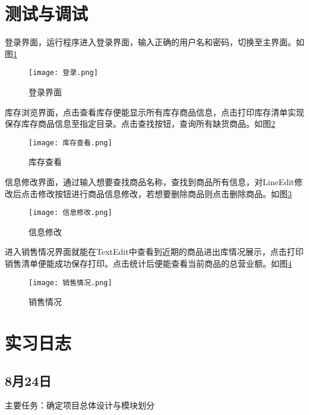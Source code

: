 \documentclass[
   projtype=report, %
   output=print,     %
  ]{nwafuprojrep}
\begin{document}
\section{测试与调试}
登录界面，运行程序进入登录界面，输入正确的用户名和密码，切换至主界面。如图\ref{fig-login}
\begin{figure}[H]
	\centering
	\texttt{[image: 登录.png]}
	\caption[登录]{登录界面}\label{fig-login}
\end{figure}

库存浏览界面，点击查看库存便能显示所有库存商品信息，点击打印库存清单实现保存库存商品信息至指定目录。点击查找按钮，查询所有缺货商品。如图\ref{fig-show}
\begin{figure}[H]
	\centering
	\texttt{[image: 库存查看.png]}
	\caption[库存查看]{库存查看}\label{fig-show}
\end{figure}
信息修改界面，通过输入想要查找商品名称，查找到商品所有信息，对LineEdit修改后点击修改按钮进行商品信息修改，若想要删除商品则点击删除商品。如图\ref{fig-change}
\begin{figure}[H]
	\centering
	\texttt{[image: 信息修改.png]}
	\caption[信息修改]{信息修改}\label{fig-change}
\end{figure}
%
进入销售情况界面就能在TextEdit中查看到近期的商品进出库情况展示，点击打印销售清单便能成功保存打印。点击统计后便能查看当前商品的总营业额。如图\ref{fig-qingkuang}
\begin{figure}[H]
	\centering
	\texttt{[image: 销售情况.png]}
	\caption[销售情况]{销售情况}\label{fig-qingkuang}
\end{figure}
\section{实习日志}
\subsection{8月24日}
主要任务：确定项目总体设计与模块划分
\end{document}
